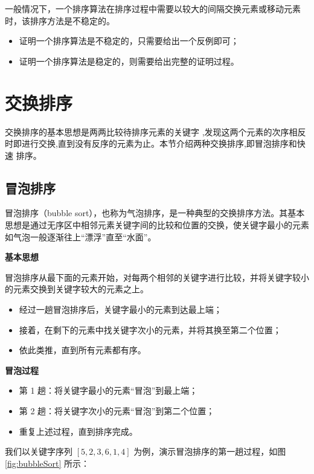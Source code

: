 \documentclass[lang=cn,newtx,10pt,scheme=chinese]{../elegantbook}
\begin{document}
一般情况下，一个排序算法在排序过程中需要以较大的间隔交换元素或移动元素时，该排序方法是不稳定的。  
\begin{itemize}
  \item 证明一个排序算法是不稳定的，只需要给出一个反例即可；
  \item 证明一个排序算法是稳定的，则需要给出完整的证明过程。
\end{itemize}

\section{交换排序}
交换排序的基本思想是两两比较待排序元素的关键字 ,发现这两个元素的次序相反
时即进行交换,直到没有反序的元素为止。本节介绍两种交换排序,即冒泡排序和快速
排序。

\subsection{冒泡排序}

冒泡排序（bubble sort），也称为气泡排序，是一种典型的交换排序方法。其基本思想是通过无序区中相邻元素关键字间的比较和位置的交换，使关键字最小的元素如气泡一般逐渐往上“漂浮”直至“水面”。


\textbf{基本思想}  

冒泡排序从最下面的元素开始，对每两个相邻的关键字进行比较，并将关键字较小的元素交换到关键字较大的元素之上。  
\begin{itemize}
  \item 经过一趟冒泡排序后，关键字最小的元素到达最上端；
  \item 接着，在剩下的元素中找关键字次小的元素，并将其换至第二个位置；
  \item 依此类推，直到所有元素都有序。
\end{itemize}

\textbf{冒泡过程}  

\begin{itemize}
  \item 第 1 趟：将关键字最小的元素“冒泡”到最上端；
  \item 第 2 趟：将关键字次小的元素“冒泡”到第二个位置；
  \item 重复上述过程，直到排序完成。
\end{itemize}

我们以关键字序列 $[5, 2, 3,6,1,4]$ 为例，演示冒泡排序的第一趟过程，如图 \ref{fig:bubbleSort} 所示：
\end{document}
